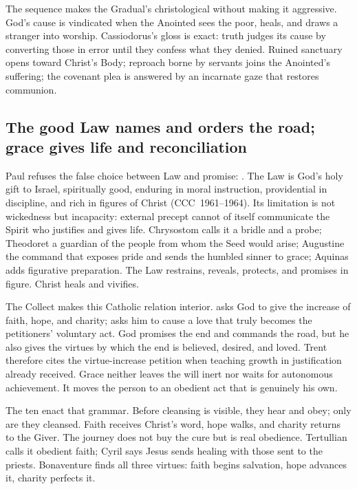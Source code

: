 The sequence makes the Gradual's  christological without
making it aggressive. God's cause is vindicated when the Anointed sees the
poor, heals, and draws a stranger into worship. Cassiodorus's gloss is exact:
truth judges its cause by converting those in error until they confess what
they denied. Ruined sanctuary opens toward Christ's Body; reproach borne by
servants joins the Anointed's suffering; the covenant plea is answered by an
incarnate gaze that restores communion.

\subsection*{The good Law names and orders the road; grace gives life and reconciliation\enspace
  }

Paul refuses the false choice between Law and promise: . The Law
is God's holy gift to Israel, spiritually good, enduring in moral instruction,
providential in discipline, and rich in figures of Christ (CCC~1961--1964).
Its limitation is not wickedness but incapacity: external precept cannot of
itself communicate the Spirit who justifies and gives life. Chrysostom calls it
a bridle and a probe; Theodoret a guardian of the people from whom the Seed
would arise; Augustine the command that exposes pride and sends the humbled
sinner to grace; Aquinas adds figurative preparation. The Law restrains,
reveals, protects, and promises in figure. Christ heals and vivifies.

The Collect makes this Catholic relation interior.  asks God to give
the increase of faith, hope, and charity;  asks him to
cause a love that truly becomes the petitioners' voluntary act. God promises
the end and commands the road, but he also gives the virtues by which the end
is believed, desired, and loved. Trent therefore cites the virtue-increase
petition when teaching growth in justification already received. Grace neither
leaves the will inert nor waits for autonomous achievement. It moves the person
to an obedient act that is genuinely his own.

The ten enact that grammar. Before cleansing is visible, they hear and obey;
only  are they cleansed. Faith receives Christ's word, hope
walks, and charity returns to the Giver. The journey does not buy the cure but
is real obedience. Tertullian calls it obedient faith; Cyril says Jesus sends
healing with those sent to the priests. Bonaventure finds all three virtues:
faith begins salvation, hope advances it, charity perfects it.

